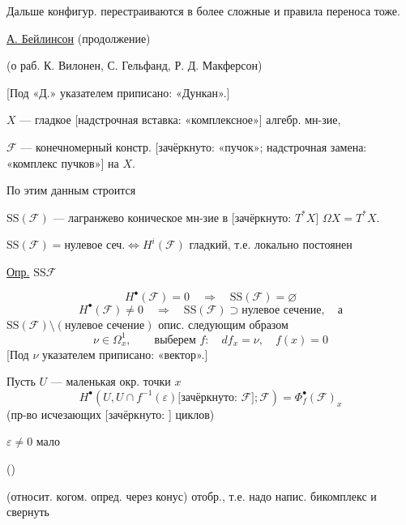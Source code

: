 Дальше конфигур. перестраиваются в более сложные и
правила переноса тоже.

\underline{\underline{А. Бейлинсон}} (продолжение)

(о раб. К. Вилонен, С. Гельфанд, Р. Д. Макферсон)

[Под «Д.» указателем приписано: «Дункан».]

$X$ — гладкое [надстрочная вставка: «комплексное»] алгебр. мн-зие,

$\mathcal{F}$ — конечномерный констр. [зачёркнуто: «пучок»; надстрочная замена: «комплекс пучков»] на $X$.

По этим данным строится

$\mathrm{SS}(\mathcal{F})$ — лагранжево коническое мн-зие в
[зачёркнуто: $T^*X$] $\Omega X=T^*X$.

$\mathrm{SS}(\mathcal{F})=\text{нулевое сеч.}\Longleftrightarrow H^i(\mathcal{F})$ гладкий, т.е. локально постоянен

\underline{Опр.} $\mathrm{SS}\mathcal{F}$

\begin{equation*}
H^\bullet(\mathcal{F})=0\quad\Rightarrow\quad\mathrm{SS}(\mathcal{F})=\varnothing\tag{1}
\end{equation*}
\begin{equation*}
H^\bullet(\mathcal{F})\neq0\quad\Rightarrow\quad\mathrm{SS}(\mathcal{F})\supset\text{нулевое сечение},\quad\text{а}
\end{equation*}
$\mathrm{SS}(\mathcal{F})\setminus(\text{нулевое сечение})$ опис. следующим образом
\begin{equation*}
\nu\in\Omega_x^1,\qquad\text{выберем }f:\quad df_x=\nu,\quad f(x)=0
\end{equation*}
[Под $\nu$ указателем приписано: «вектор».]

Пусть $U$ — маленькая окр. точки $x$
\begin{equation*}
H^\bullet(U,U\cap f^{-1}(\varepsilon)\text{[зачёркнуто: }\mathcal{F}\text{]};\mathcal{F})
=\Phi_f^\bullet(\mathcal{F})_x\tag{2}
\end{equation*}
(пр-во исчезающих [зачёркнуто: ] циклов)

$\varepsilon\neq0$ мало

()

(относит. когом. опред. через конус)
отобр., т.е. надо напис. бикомплекс и
свернуть

